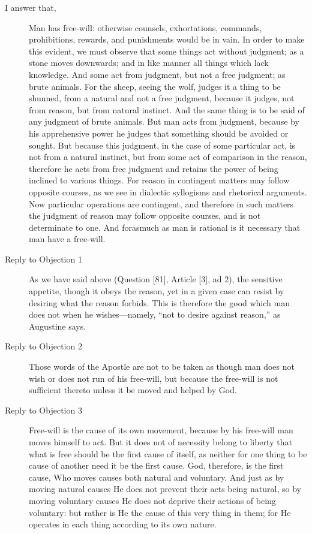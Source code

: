 \documentclass{bookclub}
\begin{document}
\begin{multicols}{2}
\begin{description}
		\item[I answer that,]  Man has free-will: otherwise counsels, exhortations, commands, prohibitions, rewards, and punishments would be in vain. In order to make this evident, we must observe that some things act without judgment; as a stone moves downwards; and in like manner all things which lack knowledge. And some act from judgment, but not a free judgment; as brute animals. For the sheep, seeing the wolf, judges it a thing to be shunned, from a natural and not a free judgment, because it judges, not from reason, but from natural instinct. And the same thing is to be said of any judgment of brute animals. But man acts from judgment, because by his apprehensive power he judges that something should be avoided or sought. But because this judgment, in the case of some particular act, is not from a natural instinct, but from some act of comparison in the reason, therefore he acts from free judgment and retains the power of being inclined to various things. For reason in contingent matters may follow opposite courses, as we see in dialectic syllogisms and rhetorical arguments. Now particular operations are contingent, and therefore in such matters the judgment of reason may follow opposite courses, and is not determinate to one. And forasmuch as man is rational is it necessary that man have a free-will.
		\item[Reply to Objection 1]  As we have said above (Question [81], Article [3], ad 2), the sensitive appetite, though it obeys the reason, yet in a given case can resist by desiring what the reason forbids. This is therefore the good which man does not when he wishes---namely, ``not to desire against reason,'' as Augustine says.
		\item[Reply to Objection 2]  Those words of the Apostle are not to be taken as though man does not wish or does not run of his free-will, but because the free-will is not sufficient thereto unless it be moved and helped by God.
		\item[Reply to Objection 3] Free-will is the cause of its own movement, because by his free-will man moves himself to act. But it does not of necessity belong to liberty that what is free should be the first cause of itself, as neither for one thing to be cause of another need it be the first cause. God, therefore, is the first cause, Who moves causes both natural and voluntary. And just as by moving natural causes He does not prevent their acts being natural, so by moving voluntary causes He does not deprive their actions of being voluntary: but rather is He the cause of this very thing in them; for He operates in each thing according to its own nature.

\end{description}
\end{multicols}
\end{document}
